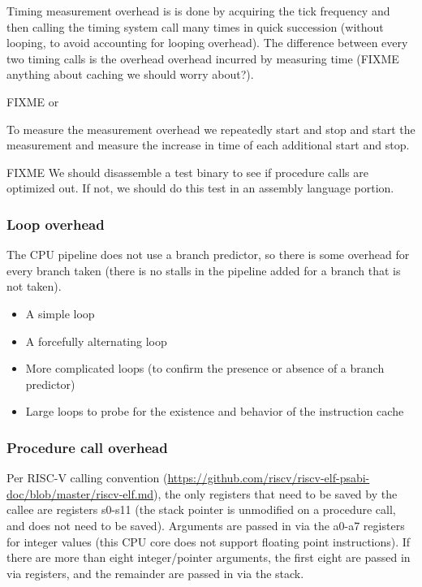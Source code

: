 \documentclass{article}
\begin{document}
Timing measurement overhead is is done by acquiring the tick frequency and then calling the timing system call many times in quick succession (without looping, to avoid accounting for looping overhead). The difference between every two timing calls is the overhead overhead incurred by measuring time (FIXME anything about caching we should worry about?).

FIXME or

To measure the measurement overhead we repeatedly start and stop and start the measurement and measure the increase in time of each additional start and stop.

FIXME We should disassemble a test binary to see if procedure calls are optimized out. If not, we should do this test in an assembly language portion.

\subsubsection{Loop overhead}

The CPU pipeline does not use a branch predictor, so there is some overhead for every branch taken (there is no stalls in the pipeline added for a branch that is not taken).
\begin{itemize}
    \item A simple loop
    \item A forcefully alternating loop
    \item More complicated loops (to confirm the presence or absence of a branch predictor)
    \item Large loops to probe for the existence and behavior of the instruction cache
\end{itemize}
    
\subsubsection{Procedure call overhead}

Per RISC-V calling convention (\url{https://github.com/riscv/riscv-elf-psabi-doc/blob/master/riscv-elf.md}), the only registers that need to be saved by the callee are registers s0-s11 (the stack pointer is unmodified on a procedure call, and does not need to be saved). Arguments are passed in via the a0-a7 registers for integer values (this CPU core does not support floating point instructions). If there are more than eight integer/pointer arguments, the first eight are passed in via registers, and the remainder are passed in via the stack.
\end{document}
